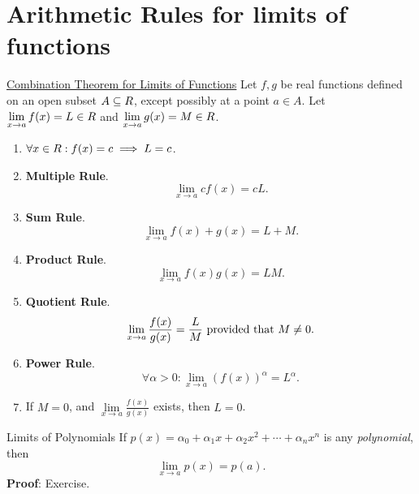 \section{Arithmetic Rules for limits of functions}
\begin{Theorem}{\href{https://proofwiki.org/wiki/Combination_Theorem_for_Limits_of_Functions}{Combination Theorem for Limits of Functions}}{}
    Let $ f,g $ be real functions defined on an open subset $ A\subseteq \relax{R} $, except
    possibly at a point $ a\in A $. Let $ \lim\limits_{{x} \to {a}}f(x)=L\in\relax{R} $
    and $ \lim\limits_{{x} \to {a}}g(x)=M\in\relax{R} $.
    \begin{enumerate}[(1)]
        \item $ \forall x\in \relax{R}:f(x)=c \implies L=c $.
        \item \textbf{Multiple Rule}.
              \[ \displaystyle \lim\limits_{{x} \to {a}}c f(x)=cL. \]
        \item \textbf{Sum Rule}.
              \[ \lim\limits_{{x} \to {a}} f(x)+g(x)=L+M. \]
        \item \textbf{Product Rule}.
              \[ \lim\limits_{{x} \to {a}}f(x)g(x)=LM. \]
        \item \textbf{Quotient Rule}.
              \[ \lim\limits_{{x} \to {a}}\frac{f(x)}{g(x)}=\frac{L}{M}\text{ provided that $ M\ne 0 $}. \]
        \item \textbf{Power Rule}.
              \[ \forall \alpha>0:\lim\limits_{{x} \to {a}}(f(x))^\alpha=L^\alpha . \]
        \item If $ M=0 $, and $ \displaystyle \lim\limits_{{x} \to {a}}\frac{f(x)}{g(x)} $ exists, then $ L=0 $.
    \end{enumerate}
\end{Theorem}
\begin{Theorem}{Limits of Polynomials}{}
    If $ p(x)=\alpha_0+\alpha_1 x+\alpha_2 x^2+\cdots+\alpha_n x^n $ is any \emph{polynomial}, then
    \[ \lim\limits_{{x} \to {a}}p(x)=p(a). \]
    \tcblower{}
    \textbf{Proof}: Exercise.
\end{Theorem}
